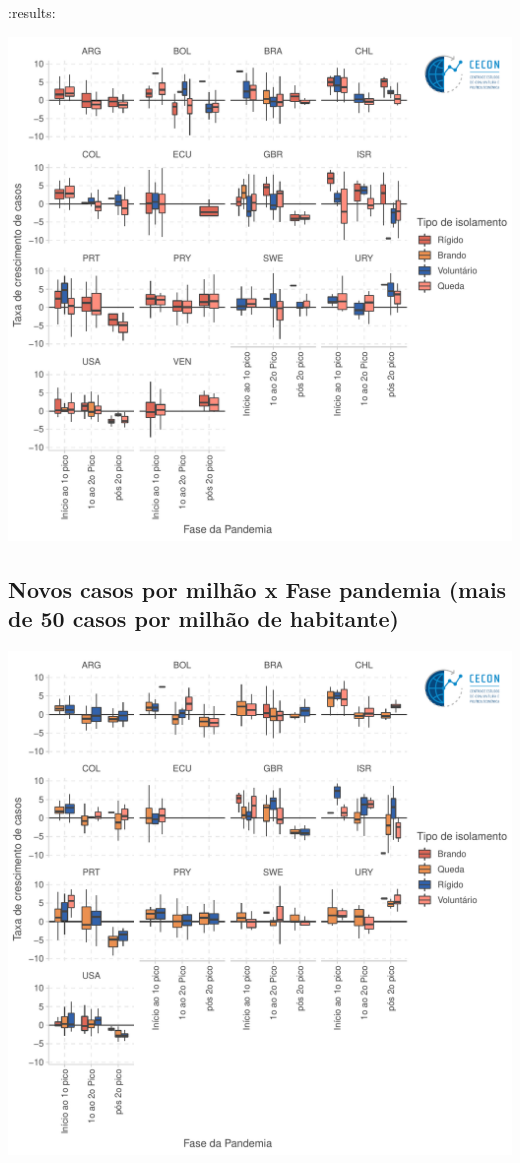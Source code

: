 \documentclass{SelfArx}
\begin{document}
:results:
\begin{center}
\includegraphics[width=.9\linewidth]{./figs/COVID/Casos_Policy_10_Todos.pdf}
\end{center}
\subsection*{Novos casos por milhão x Fase pandemia (mais de 50 casos por milhão de habitante)}
\label{sec:org2fa1737}

\begin{center}
\includegraphics[width=.9\linewidth]{./figs/COVID/Casos_Policy_50_Todos.pdf}
\end{center}
\end{document}
